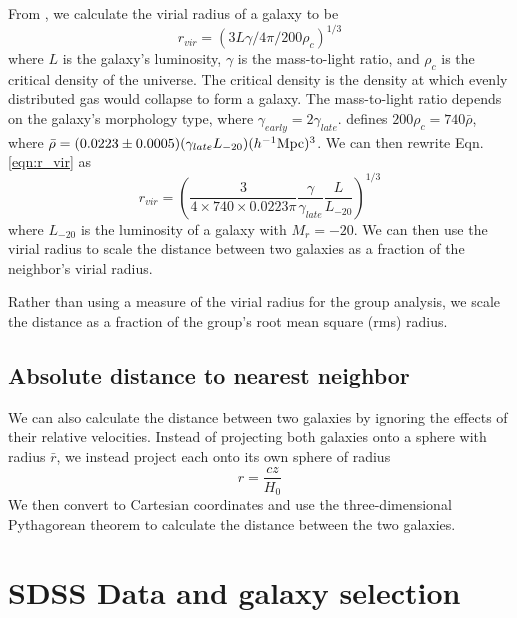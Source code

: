From \cite{Hwang10}, we calculate the virial radius of a galaxy to be
\begin{equation}\label{eqn:r_vir}
    r_{vir} = (3L\gamma/4\pi/200\rho_c)^{1/3}
\end{equation}
where $L$ is the galaxy's luminosity, $\gamma$ is the mass-to-light ratio, and 
$\rho_c$ is the critical density of the universe.  The critical density is the 
density at which evenly distributed gas would collapse to form a galaxy.  The 
mass-to-light ratio depends on the galaxy's morphology type, where 
$\gamma_{early} = 2\gamma_{late}$.  \cite{Hwang10} defines 
$200\rho_c = 740\bar{\rho}$, where 
$\bar{\rho} = (0.0223\pm 0.0005)(\gamma_{late}L_{-20})(\text{$h^{-1}$Mpc})^3$.  We can 
then rewrite Eqn. \ref{eqn:r_vir} as
\begin{equation}
    r_{vir} = \left( \frac{3}{4\times 740\times 0.0223\pi} \frac{\gamma}{\gamma_{late}} \frac{L}{L_{-20}} \right)^{1/3}
\end{equation}
where $L_{-20}$ is the luminosity of a galaxy with $M_r = -20$.  We can then use 
the virial radius to scale the distance between two galaxies as a fraction of 
the neighbor's virial radius.

Rather than using a measure of the virial radius for the group analysis, we 
scale the distance as a fraction of the group's root mean square (rms) radius.


\subsection{Absolute distance to nearest neighbor}

We can also calculate the distance between two galaxies by ignoring the effects 
of their relative velocities.  Instead of projecting both galaxies onto a sphere 
with radius $\bar{r}$, we instead project each onto its own sphere of radius 
\begin{equation}
    r = \frac{cz}{H_0}
\end{equation}
We then convert to Cartesian coordinates and use the three-dimensional 
Pythagorean theorem to calculate the distance between the two galaxies.




\section[Data]{SDSS Data and galaxy selection}


